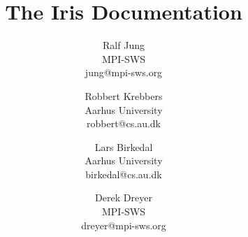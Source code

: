 \documentclass[10pt]{article}
\begin{document}
\title{\bfseries The Iris Documentation}

\author{%
 Ralf Jung \\ MPI-SWS \\ jung@mpi-sws.org \and
 Robbert Krebbers \\ Aarhus University \\ robbert@cs.au.dk \and
 Lars Birkedal \\ Aarhus University \\ birkedal@cs.au.dk \and
 Derek Dreyer \\ MPI-SWS \\ dreyer@mpi-sws.org}

\maketitle

\thispagestyle{empty}

\tableofcontents

\clearpage\begingroup

\endgroup\clearpage\begingroup

%
%
%
\printbibliography
\endgroup
\end{document}
